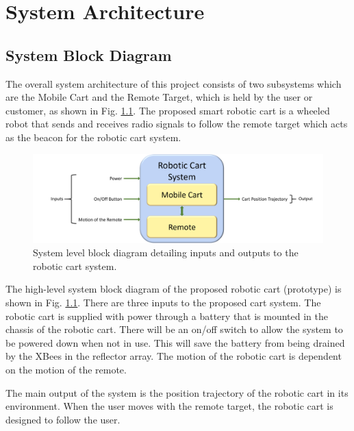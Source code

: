\chapter{System Architecture}
\label{ch: Chapter2}

\section{System Block Diagram}
The overall system architecture of this project consists of two subsystems which
are the Mobile Cart and the Remote Target, which is held by the user or
customer, as shown in Fig. \ref{fig:sys_block_diag}. The proposed smart robotic
cart is a wheeled robot that sends and receives radio signals to follow the
remote target which acts as the beacon for the robotic cart system. %
%
\begin{figure}
  \centering
  \includegraphics[width=\textwidth]{figs/img/systemBlockDiagram.png}
  \caption{System level block diagram detailing inputs and outputs to the
    robotic cart system.}
	\label{fig:sys_block_diag}
\end{figure}
%

\vspace*{12pt}
\noindent
The high-level system block diagram of the proposed robotic cart (prototype) is shown in Fig. \ref{fig:sys_block_diag}. There are three inputs to the proposed cart system. The robotic cart is supplied with power through a battery that is mounted in the chassis of the robotic cart. There will be an on/off switch to allow the system to be powered down when not in use. This will save the battery from being drained by the XBees in the reflector array. The motion of the robotic cart is dependent on the motion of the remote.

\vspace*{12pt}
\noindent
The main output of the system is the position trajectory of the robotic cart in its environment. When the user moves with the remote target, the robotic cart is designed to follow the user.



